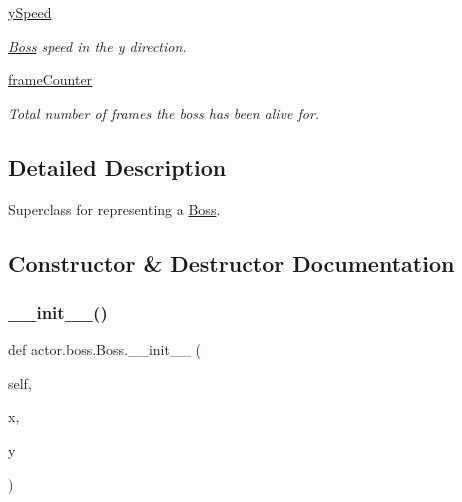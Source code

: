 \begin{DoxyCompactItemize}
\mbox{\label{classactor_1_1boss_1_1_boss_af3ffc8e8c2a5637f468355a055d4671f}} 
\hyperlink{classactor_1_1boss_1_1_boss_af3ffc8e8c2a5637f468355a055d4671f}{y\+Speed}
\begin{DoxyCompactList}\small\item\em \hyperlink{classactor_1_1boss_1_1_boss}{Boss}\textquotesingle{} speed in the y direction. \end{DoxyCompactList}\item 
\mbox{\label{classactor_1_1boss_1_1_boss_aca7d6c634a4af8380231efe3c2636080}} 
\hyperlink{classactor_1_1boss_1_1_boss_aca7d6c634a4af8380231efe3c2636080}{frame\+Counter}
\begin{DoxyCompactList}\small\item\em Total number of frames the boss has been alive for. \end{DoxyCompactList}\end{DoxyCompactItemize}


\subsection{Detailed Description}
Superclass for representing a \hyperlink{classactor_1_1boss_1_1_boss}{Boss}. 

\subsection{Constructor \& Destructor Documentation}
\mbox{\label{classactor_1_1boss_1_1_boss_a8aff9faf12326306058968f2e6424420}} 
\subsubsection{\texorpdfstring{\+\_\+\+\_\+init\+\_\+\+\_\+()}{\_\_init\_\_()}}
{\footnotesize\ttfamily def actor.\+boss.\+Boss.\+\_\+\+\_\+init\+\_\+\+\_\+ (\begin{DoxyParamCaption}\item[{}]{self,  }\item[{}]{x,  }\item[{}]{y }\end{DoxyParamCaption})}



